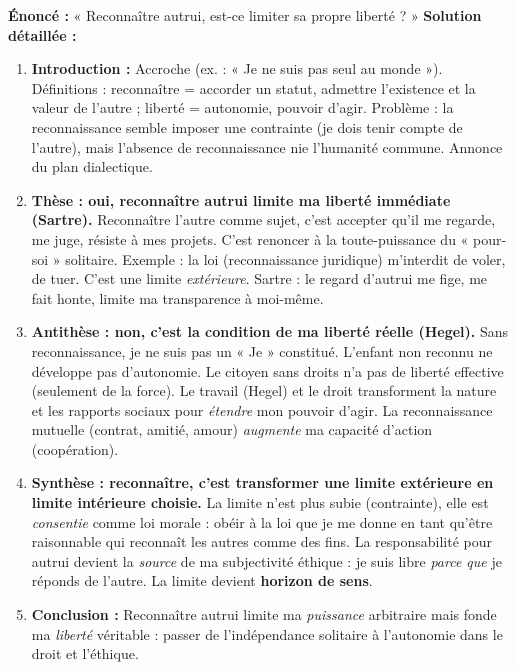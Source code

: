 \documentclass[11pt]{article}
\begin{document}
\begin{exoresolu}
\textbf{Énoncé :} « Reconnaître autrui, est-ce limiter sa propre liberté ? »
\tcblower
\textbf{Solution détaillée :}
\begin{enumerate}
    \item \textbf{Introduction :} Accroche (ex. : « Je ne suis pas seul au monde »). Définitions : reconnaître = accorder un statut, admettre l'existence et la valeur de l'autre ; liberté = autonomie, pouvoir d'agir. Problème : la reconnaissance semble imposer une contrainte (je dois tenir compte de l'autre), mais l'absence de reconnaissance nie l'humanité commune. Annonce du plan dialectique.
    \item \textbf{Thèse : oui, reconnaître autrui limite ma liberté immédiate (Sartre).} Reconnaître l'autre comme sujet, c'est accepter qu'il me regarde, me juge, résiste à mes projets. C'est renoncer à la toute-puissance du « pour-soi » solitaire. Exemple : la loi (reconnaissance juridique) m'interdit de voler, de tuer. C'est une limite \emph{extérieure}. Sartre : le regard d'autrui me fige, me fait honte, limite ma transparence à moi-même.
    \item \textbf{Antithèse : non, c'est la condition de ma liberté réelle (Hegel).} Sans reconnaissance, je ne suis pas un « Je » constitué. L'enfant non reconnu ne développe pas d'autonomie. Le citoyen sans droits n'a pas de liberté effective (seulement de la force). Le travail (Hegel) et le droit transforment la nature et les rapports sociaux pour \emph{étendre} mon pouvoir d'agir. La reconnaissance mutuelle (contrat, amitié, amour) \emph{augmente} ma capacité d'action (coopération).
    \item \textbf{Synthèse : reconnaître, c'est transformer une limite extérieure en limite intérieure choisie.} La limite n'est plus subie (contrainte), elle est \emph{consentie} comme loi morale : obéir à la loi que je me donne en tant qu'être raisonnable qui reconnaît les autres comme des fins. La responsabilité pour autrui devient la \emph{source} de ma subjectivité éthique : je suis libre \emph{parce que} je réponds de l'autre. La limite devient \textbf{horizon de sens}.
    \item \textbf{Conclusion :} Reconnaître autrui limite ma \emph{puissance} arbitraire mais fonde ma \emph{liberté} véritable : passer de l'indépendance solitaire à l'autonomie dans le droit et l'éthique.
\end{enumerate}
\end{exoresolu}
\end{document}
